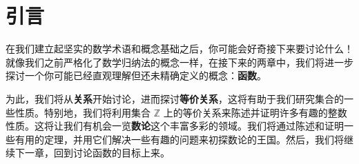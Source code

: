 \section{引言}

在我们建立起坚实的数学术语和概念基础之后，你可能会好奇接下来要讨论什么！就像我们之前严格化了数学归纳法的概念一样，在接下来的两章中，我们将进一步探讨一个你可能已经直观理解但还未精确定义的概念：\textbf{函数}。

为此，我们将从\textbf{关系}开始讨论，进而探讨\textbf{等价关系}，这将有助于我们研究集合的一些性质。特别地，我们将利用集合 $\mathbb{Z}$ 上的等价关系来陈述并证明许多有趣的整数性质。这将让我们有机会一览\textbf{数论}这个丰富多彩的领域。我们将通过陈述和证明一些有用的定理，并用它们解决一些有趣的问题来初探数论的王国。然后，我们将继续下一章，回到讨论函数的目标上来。







